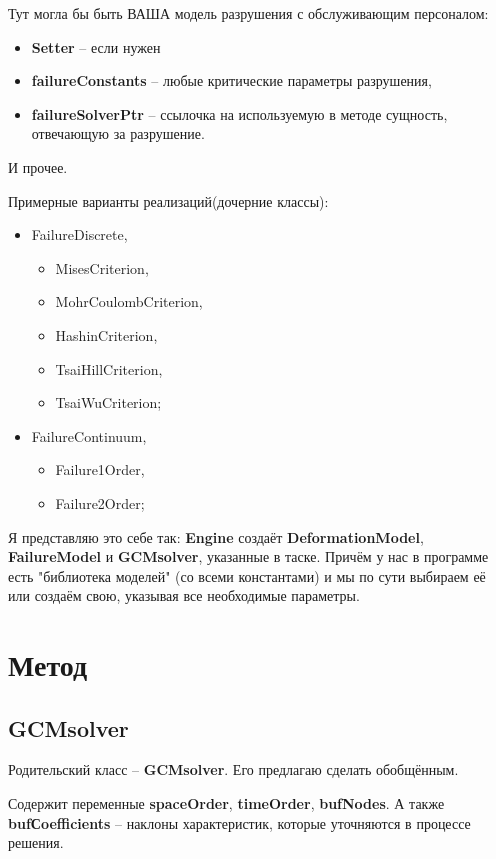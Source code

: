 \documentclass[a4paper,12pt]{article}
\numberwithin{equation}{section}
\begin{document}
	Тут могла бы быть ВАША модель разрушения с обслуживающим персоналом:
	\begin{itemize}
		\item{\textbf{Setter} -- если нужен}
		\item{\textbf{failureConstants} -- любые критические параметры разрушения,}
		\item{\textbf{failureSolverPtr} -- ссылочка на используемую в методе сущность, отвечающую за разрушение.}
	\end{itemize}	
	И прочее.
	
	Примерные варианты реализаций(дочерние классы):
	\begin{itemize}
		\item{FailureDiscrete,}
		\begin{itemize}
			\item{MisesCriterion,}
			\item{MohrCoulombCriterion,}
			\item{HashinCriterion,}
			\item{TsaiHillCriterion,}
			\item{TsaiWuCriterion;}
		\end{itemize}
		\item{FailureContinuum,}
		\begin{itemize}
			\item{Failure1Order,}
			\item{Failure2Order;}
		\end{itemize}
	\end{itemize}
	
	Я представляю это себе так: \textbf{Engine} создаёт \textbf{DeformationModel}, \textbf{FailureModel} и \textbf{GCMsolver}, указанные в таске. Причём у нас в программе есть "библиотека моделей" (со всеми константами) и мы по сути выбираем её или создаём свою, указывая все необходимые параметры.
	
\section{Метод}
\subsection{GCMsolver}
	Родительский класс -- \textbf{GCMsolver}. Его предлагаю сделать обобщённым.
	
	Содержит переменные \textbf{spaceOrder}, \textbf{timeOrder}, \textbf{bufNodes}.
	А также \textbf{bufСoefficients} -- наклоны характеристик, которые уточняются в процессе решения.
	
\end{document}
